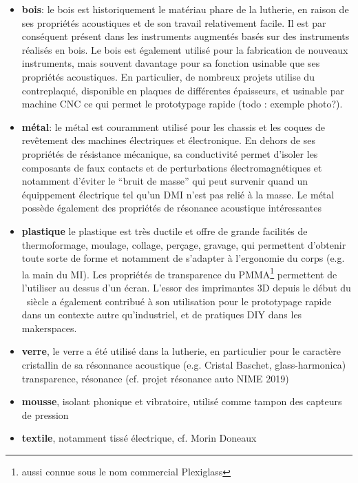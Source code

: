 \vspace{-1em}
\begin{itemize}[noitemsep]
	\item \textbf{bois}: le bois est historiquement le matériau phare de la lutherie, en raison de ses propriétés acoustiques et de son travail relativement facile. Il est par conséquent présent dans les instruments augmentés basés sur des instruments réalisés en bois. Le bois est également utilisé pour la fabrication de nouveaux instruments, mais souvent davantage pour sa fonction usinable que ses propriétés acoustiques. En particulier, de nombreux projets utilise du contreplaqué, disponible en plaques de différentes épaisseurs, et usinable par machine \gls{CNC} ce qui permet le prototypage rapide (todo : exemple photo?).
	\item \textbf{métal}: le métal est couramment utilisé pour les chassis et les coques de revêtement des machines électriques et électronique. En dehors de ses propriétés de résistance mécanique, sa conductivité permet d'isoler les composants de faux contacts et de perturbations électromagnétiques et notamment d'éviter le ``bruit de masse'' qui peut survenir quand un équippement électrique tel qu'un \gls{DMI} n'est pas relié à la masse. Le métal possède également des propriétés de résonance acoustique intéressantes
	\item \textbf{plastique} le plastique est très ductile et offre de grande facilités de thermoformage, moulage, collage, perçage, gravage, qui permettent d'obtenir toute sorte de forme et notamment de s'adapter à l'ergonomie du corps (e.g. la main du MI). Les propriétés de transparence du \gls{PMMA}\footnote{aussi connue sous le nom commercial Plexiglass} permettent de l'utiliser au dessus d'un écran. L'essor des imprimantes 3D depuis le début du ~siècle a également contribué à son utilisation pour le prototypage rapide dans un contexte autre qu'industriel, et de pratiques \gls{DIY} dans les \glspl{makerspace}.
	\item \textbf{verre}, le verre a été utilisé dans la lutherie, en particulier pour le caractère cristallin de sa résonnance acoustique (e.g. Cristal Baschet, glass-harmonica) transparence, résonance (cf. projet résonance auto NIME 2019)
	\item \textbf{mousse}, isolant phonique et vibratoire, utilisé comme tampon des capteurs de pression
	\item \textbf{textile}, notamment tissé électrique, cf. Morin Doneaux
\end{itemize}

